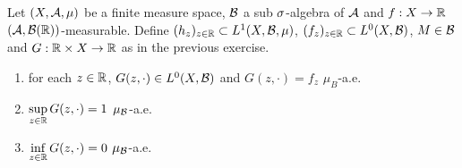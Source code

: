 \documentclass{book}
\begin{document}
	\begin{ex}
		Let $(X, \mathcal{A}, \mu)$ be a finite measure space, $\mathcal{B}$ a sub $\sigma$-algebra of $\mathcal{A}$ and $f: X \rightarrow \mathbb{R}$ $(\mathcal{A}, \mathcal{B}(\mathbb{R}))$-measurable. Define $(h_z)_{z \in \mathbb{R}} \subset L^1(X, \mathcal{B}, \mu)$, $(f_z)_{z \in \mathbb{R}} \subset L^0(X, \mathcal{B})$, $M \in \mathcal{B}$ and $G:\mathbb{R} \times X \rightarrow \mathbb{R}$ as in the previous exercise.
		\begin{enumerate}
			\item for each $z \in \mathbb{R}$, $G(z, \cdot) \in L^0(X, \mathcal{B})$ and $G(z, \cdot) = f_z$ $\mu_B$-a.e.
			\item $\sup\limits_{z \in \mathbb{R}} G(z, \cdot) = 1$ $\mu_{\mathcal{B}}$-a.e.
			\item $\inf\limits_{z \in \mathbb{R}} G(z, \cdot) = 0$ $\mu_{\mathcal{B}}$-a.e.
		\end{enumerate}
	\end{ex}
	
\end{document}
